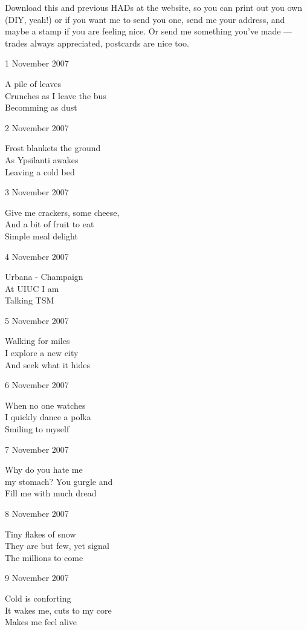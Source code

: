 \documentclass[12pt]{article}
\begin{document}
Download this and previous HADs at the website, so you can
print out you own (DIY, yeah!) or if you want me to send
you one, send me your address, and maybe a stamp if you
are feeling nice. Or send me something you've made ---
trades always appreciated, postcards are nice too.

1 November 2007

A pile of leaves \\
Crunches as I leave the bus \\
Becomming as dust

2 November 2007

Frost blankets the ground \\
As Ypsilanti awakes \\
Leaving a cold bed

\newpage

3 November 2007

Give me crackers, some cheese, \\
And a bit of fruit to eat \\
Simple meal delight

4 November 2007

Urbana - Champaign \\
At UIUC I am \\
Talking TSM

5 November 2007

Walking for miles \\
I explore a new city \\
And seek what it hides

6 November 2007

When no one watches \\
I quickly dance a polka \\
Smiling to myself

7 November 2007

Why do you hate me \\
my stomach? You gurgle and \\
Fill me with much dread

8 November 2007

Tiny flakes of snow \\
They are but few, yet signal \\
The millions to come

9 November 2007

Cold is conforting \\
It wakes me, cuts to my core \\
Makes me feel alive
\end{document}
